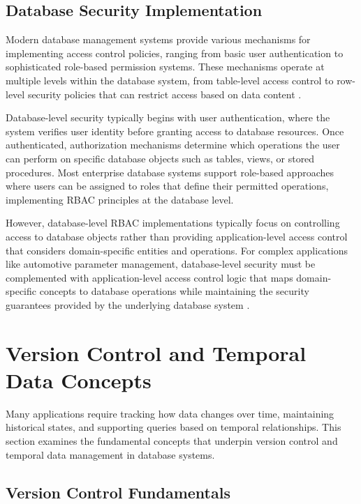 \subsection{Database Security Implementation}
\label{subsec:database-security}

Modern database management systems provide various mechanisms for implementing access control policies, ranging from basic user authentication to sophisticated role-based permission systems. These mechanisms operate at multiple levels within the database system, from table-level access control to row-level security policies that can restrict access based on data content \cite{shaik2020postgresql}.

Database-level security typically begins with user authentication, where the system verifies user identity before granting access to database resources. Once authenticated, authorization mechanisms determine which operations the user can perform on specific database objects such as tables, views, or stored procedures. Most enterprise database systems support role-based approaches where users can be assigned to roles that define their permitted operations, implementing \ac{RBAC} principles at the database level.

However, database-level \ac{RBAC} implementations typically focus on controlling access to database objects rather than providing application-level access control that considers domain-specific entities and operations. For complex applications like automotive parameter management, database-level security must be complemented with application-level access control logic that maps domain-specific concepts to database operations while maintaining the security guarantees provided by the underlying database system \cite{sciore2009database}.

\section{Version Control and Temporal Data Concepts}
\label{sec:version-control-temporal}

Many applications require tracking how data changes over time, maintaining historical states, and supporting queries based on temporal relationships. This section examines the fundamental concepts that underpin version control and temporal data management in database systems.

\subsection{Version Control Fundamentals}
\label{subsec:version-control-fundamentals}

